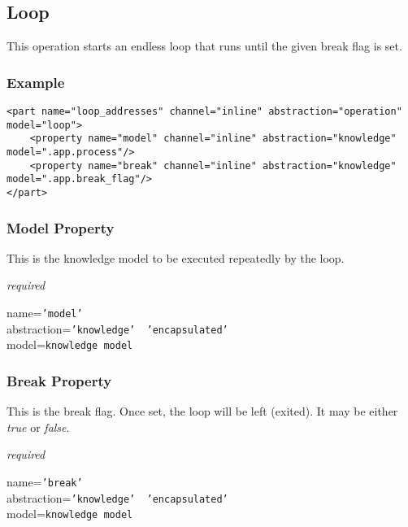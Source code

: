 %
%
%
%
%
%

\subsection{Loop}
\label{loop_heading}

This operation starts an endless loop that runs until the given break flag is
set.

\subsubsection{Example}

\begin{scriptsize}
    \begin{verbatim}
<part name="loop_addresses" channel="inline" abstraction="operation" model="loop">
    <property name="model" channel="inline" abstraction="knowledge" model=".app.process"/>
    <property name="break" channel="inline" abstraction="knowledge" model=".app.break_flag"/>
</part>
    \end{verbatim}
\end{scriptsize}

\subsubsection{Model Property}

This is the knowledge model to be executed repeatedly by the loop.

\emph{required}

name=\texttt{'model'}\\
abstraction=\texttt{'knowledge' \vline\ 'encapsulated'}\\
model=\texttt{knowledge model}

\subsubsection{Break Property}

This is the break flag. Once set, the loop will be left (exited). It may be
either \emph{true} or \emph{false}.

\emph{required}

name=\texttt{'break'}\\
abstraction=\texttt{'knowledge' \vline\ 'encapsulated'}\\
model=\texttt{knowledge model}

